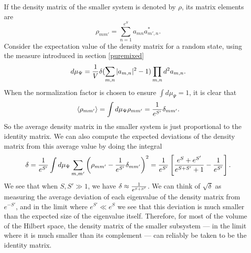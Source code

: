 \documentclass[12pt]{article}
\newcommand{\be}{\begin{equation}}
\newcommand{\ee}{\end{equation}}
\begin{document}
If the density matrix of the smaller system is denoted by $\rho$, its matrix elements are
\be
\rho_{m m'} = \sum_{n=1}^{e^{S}} a_{m n} a_{m',n}^*.
\ee
Consider the expectation value of the density matrix for a random state, using the measure introduced in section \ref{puremixed}
\be
d \mu_{\Psi} = {1 \over V} \delta(\sum_{m,n} |a_{m,n}|^2 - 1)\prod_{m,n}  d^2 a_{m,n}.
\ee
When the normalization factor is chosen to ensure  $\int d \mu_{\Psi} = 1$,  it is clear that
\be
\label{expectdensity}
\langle \rho_{m m'} \rangle = \int d \mu_{\Psi} \rho_{m m'} = {1 \over e^{S'}} \delta_{m m'}.
\ee
So the average density matrix in the smaller system is just proportional to the identity matrix. We can also compute the expected deviations of the density matrix from this average value by doing the integral
\be
\delta = {1 \over e^{S'}} \int d \mu_{\Psi} \sum_{m, m'} \left(\rho_{m m'} - {1 \over e^{S'}} \delta_{m m'} \right)^2 = {1 \over e^{S'}} \left[{e^{S} + e^{S'}  \over e^{S + S'} + 1} - {1 \over e^{S'}}\right].
\ee
We see that when $S,S' \gg 1$, we have  $\delta \approx {1 \over e^{S + S'}}$.
We can think of  $\sqrt{\delta}$ as  measuring the average deviation of each eigenvalue of the density matrix from $e^{-S'}$, and in the limit where $e^{S'} \ll e^{S}$  we see that this deviation is much smaller than the expected size of the eigenvalue itself. Therefore, for most of the volume of the Hilbert space, the density matrix of the smaller subsystem --- in the limit
where it is much smaller than its complement --- can reliably be taken to be the identity matrix.
\end{document}
